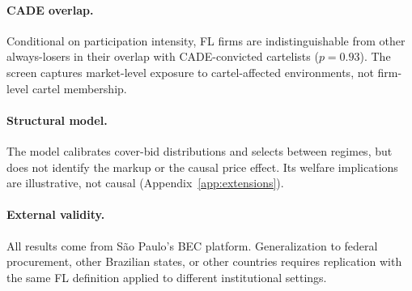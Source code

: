 \paragraph{CADE overlap.}
Conditional on participation intensity, FL firms are indistinguishable
from other always-losers in their overlap with CADE-convicted
cartelists ($p = 0.93$). The screen captures market-level exposure to
cartel-affected environments, not firm-level cartel membership.

\paragraph{Structural model.}
The model calibrates cover-bid distributions and selects between
regimes, but does not identify the markup or the causal price effect.
Its welfare implications are illustrative, not causal
(Appendix~\ref{app:extensions}).

\paragraph{External validity.}
All results come from S\~ao Paulo's BEC platform. Generalization to
federal procurement, other Brazilian states, or other countries
requires replication with the same FL definition applied to different
institutional settings.
